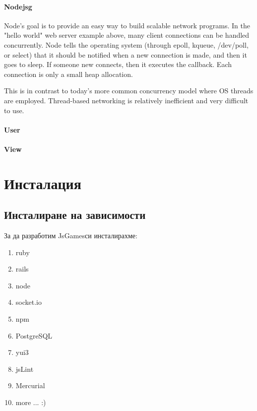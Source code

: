 \documentclass[a4paper]{article}
\def\jsg{JsGames}
\begin{document}

\paragraph{Nodejsg}
Node's goal is to provide an easy way to build scalable network programs. In the "hello world" web server example above, many client connections can be handled concurrently. Node tells the operating system (through epoll, kqueue, /dev/poll, or select) that it should be notified when a new connection is made, and then it goes to sleep. If someone new connects, then it executes the callback. Each connection is only a small heap allocation.

This is in contrast to today's more common concurrency model where OS threads are employed. Thread-based networking is relatively inefficient and very difficult to use.

\paragraph{User}

\paragraph{View}

\section{Инсталация}

\subsection{Инсталиране на зависимости}

За да разработим \jsg си инсталирахме:
\begin{enumerate}
  \item ruby
  \item rails
  \item node
  \item socket.io
  \item npm
  \item PostgreSQL
  \item yui3
  \item jsLint
  \item Mercurial
  \item more ... :)
\end{enumerate}
\end{document}
